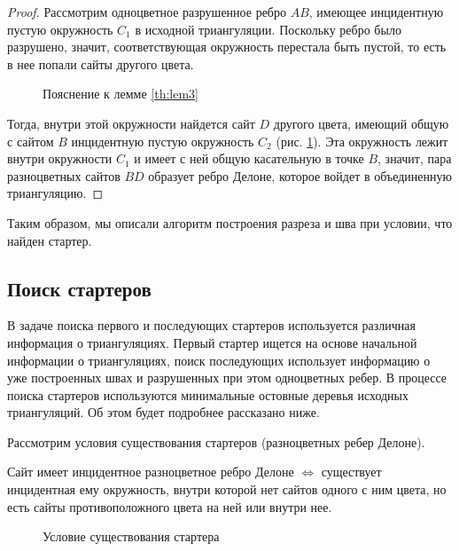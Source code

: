 \documentclass[12pt]{article}
\begin{document}
\begin{proof}
Рассмотрим одноцветное разрушенное ребро $AB$, имеющее инцидентную пустую окружность $C_1$ в исходной триангуляции.
Поскольку ребро было разрушено, значит, соответствующая окружность перестала быть пустой,
то есть в нее попали сайты другого цвета.

\begin{figure}[htb!]
	\caption{Пояснение к лемме \ref{th:lem3}}
	\label{pic:l31}
\end{figure}

Тогда, внутри этой окружности найдется сайт $D$ другого цвета, имеющий общую с сайтом $B$ инцидентную пустую окружность $C_2$ (рис. \ref{pic:l31}). Эта окружность лежит внутри окружности $C_1$ и имеет с ней общую касательную в точке $B$, значит, пара разноцветных сайтов $BD$ образует ребро Делоне, которое войдет в объединенную триангуляцию.
\end{proof}

Таким образом, мы описали алгоритм построения разреза и шва при условии, что найден стартер.

\subsection{Поиск стартеров}
В задаче поиска первого и последующих стартеров используется различная информация о триангуляциях.
Первый стартер ищется на основе начальной информации о триангуляциях,
поиск последующих использует информацию о уже построенных швах и разрушенных при этом одноцветных ребер.
В процессе поиска стартеров используются минимальные остовные деревья исходных триангуляций.
Об этом будет подробнее рассказано ниже.

Рассмотрим условия существования стартеров (разноцветных ребер Делоне).

\begin{lemma}
\label{th:lem4}
Сайт имеет инцидентное разноцветное ребро Делоне $\Leftrightarrow$ существует инцидентная ему окружность, внутри которой нет сайтов одного с ним цвета, но есть сайты противоположного цвета на ней или внутри нее.
\end{lemma}

\begin{figure}[htb!]
	\caption{Условие существования стартера}
	\label{pic:starterLemma}
\end{figure}
\end{document}
